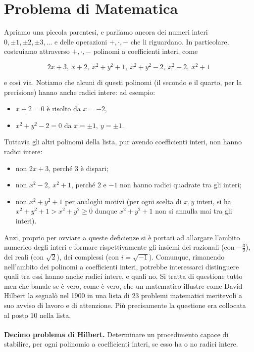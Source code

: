 \section{Problema di Matematica}

Apriamo una piccola parentesi, e parliamo ancora dei numeri interi
$0, \pm 1, \pm 2, \pm 3, ...$
e delle operazioni $+, \cdot, -$ che li riguardano. In particolare, costruiamo
attraverso $+, \cdot, -$ polinomi a coefficienti interi, come

\[
    2x + 3, \ x + 2, \ x^{2} + y^{2} + 1, \ x^{2} + y^{2} - 2, \
    x^{2} - 2, \ x^{2} + 1
\]

e così via. Notiamo che alcuni di questi polinomi (il secondo e il quarto, per la
precisione) hanno anche radici intere: ad esempio:

\begin{itemize}
    \item $x + 2 = 0$ è risolto da $x = -2$,
    \item $x^{2} + y^{2} - 2 = 0$ da $x = \pm 1, \ y = \pm 1$.
\end{itemize}

Tuttavia gli altri polinomi della lista, pur avendo coefficienti interi, non hanno
radici intere:

\begin{itemize}
    \item non $2x + 3$, perché $3$ è dispari;
    \item non $x^{2} - 2, \ x^{2} + 1$, perché $2$ e $-1$ non hanno radici quadrate tra gli interi;
    \item non $x^{2} + y^{2} + 1$ per analoghi motivi (per ogni scelta di $x, y$ interi, si ha $x^{2} +
              y^{2} + 1 > x^{2} + y{^2} \geq 0$ dunque $x^{2} + y{^2} + 1$ non si annulla mai tra gli interi).
\end{itemize}

Anzi, proprio per ovviare a queste deficienze si è portati ad allargare l'ambito
numerico degli interi e formare rispettivamente gli insiemi dei razionali (con $- \frac{3}{2}$),
dei reali (con $\sqrt{2}$), dei complessi (con $i = \sqrt{-1}$).
Comunque, rimanendo nell'ambito dei polinomi a coefficienti interi, potrebbe interessarci distinguere
quali tra essi hanno anche radici intere, e quali no. Si tratta di questione tutto men che banale se
è vero, come è vero, che un matematico illustre come David Hilbert la segnalò nel 1900 in una lista di
23 problemi matematici meritevoli a suo avviso di lavoro e di attenzione.
Più precisamente la questione era collocata al posto 10 nella lista.\\
\ \\
\textbf{Decimo problema di Hilbert.} Determinare un procedimento capace di stabilire,
per ogni polinomio a coefficienti interi, se esso ha o no radici intere.

